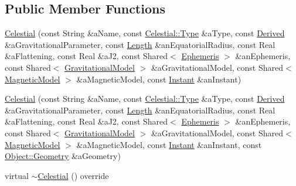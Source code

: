 \subsection*{Public Member Functions}
\begin{DoxyCompactItemize}
\item 
\hyperlink{classlibrary_1_1physics_1_1env_1_1obj_1_1_celestial_adf1dac5a930df5a8c1ab6497593b3d1b}{Celestial} (const String \&a\+Name, const \hyperlink{classlibrary_1_1physics_1_1env_1_1obj_1_1_celestial_aab1f58aa727e639288d65f3d33c4f245}{Celestial\+::\+Type} \&a\+Type, const \hyperlink{classlibrary_1_1physics_1_1units_1_1_derived}{Derived} \&a\+Gravitational\+Parameter, const \hyperlink{classlibrary_1_1physics_1_1units_1_1_length}{Length} \&an\+Equatorial\+Radius, const Real \&a\+Flattening, const Real \&a\+J2, const Shared$<$ \hyperlink{classlibrary_1_1physics_1_1env_1_1_ephemeris}{Ephemeris} $>$ \&an\+Ephemeris, const Shared$<$ \hyperlink{namespacelibrary_1_1physics_1_1env_1_1obj_ade509c84a4970a3420c03c058ada152a}{Gravitational\+Model} $>$ \&a\+Gravitational\+Model, const Shared$<$ \hyperlink{namespacelibrary_1_1physics_1_1env_1_1obj_a86d4e595a77f8bd5ed03ecd32c3a80de}{Magnetic\+Model} $>$ \&a\+Magnetic\+Model, const \hyperlink{classlibrary_1_1physics_1_1time_1_1_instant}{Instant} \&an\+Instant)
\item 
\hyperlink{classlibrary_1_1physics_1_1env_1_1obj_1_1_celestial_a42ae8e153f9c3c567e2b4bf9606cf9c4}{Celestial} (const String \&a\+Name, const \hyperlink{classlibrary_1_1physics_1_1env_1_1obj_1_1_celestial_aab1f58aa727e639288d65f3d33c4f245}{Celestial\+::\+Type} \&a\+Type, const \hyperlink{classlibrary_1_1physics_1_1units_1_1_derived}{Derived} \&a\+Gravitational\+Parameter, const \hyperlink{classlibrary_1_1physics_1_1units_1_1_length}{Length} \&an\+Equatorial\+Radius, const Real \&a\+Flattening, const Real \&a\+J2, const Shared$<$ \hyperlink{classlibrary_1_1physics_1_1env_1_1_ephemeris}{Ephemeris} $>$ \&an\+Ephemeris, const Shared$<$ \hyperlink{namespacelibrary_1_1physics_1_1env_1_1obj_ade509c84a4970a3420c03c058ada152a}{Gravitational\+Model} $>$ \&a\+Gravitational\+Model, const Shared$<$ \hyperlink{namespacelibrary_1_1physics_1_1env_1_1obj_a86d4e595a77f8bd5ed03ecd32c3a80de}{Magnetic\+Model} $>$ \&a\+Magnetic\+Model, const \hyperlink{classlibrary_1_1physics_1_1time_1_1_instant}{Instant} \&an\+Instant, const \hyperlink{classlibrary_1_1physics_1_1env_1_1_object_abdf50733c7ad97327fb64edca5670f13}{Object\+::\+Geometry} \&a\+Geometry)
\item 
virtual \hyperlink{classlibrary_1_1physics_1_1env_1_1obj_1_1_celestial_a508a59c34ac23a582f2fed6003c4c907}{$\sim$\+Celestial} () override

\end{DoxyCompactItemize}

